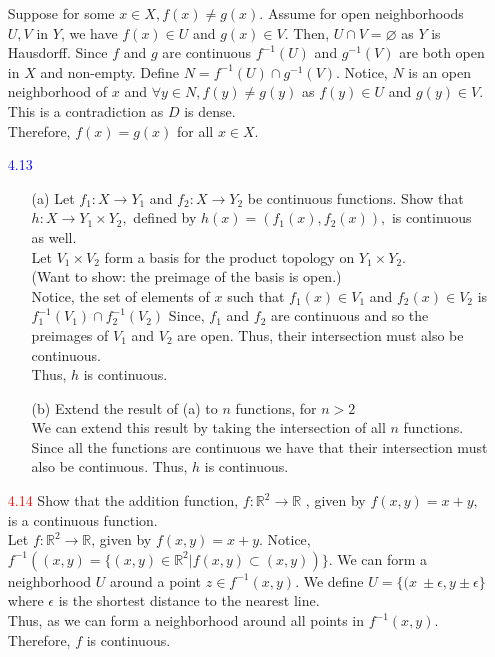 \documentclass[12pt]{article}
\newcommand{\R}{\mathbb{R}}
\begin{document}
\begin{enumerate}
	Suppose for some $ x\in X, f(x)\not= g(x) $. Assume for open neighborhoods $ U,V $ in $ Y $, we have $ f(x)\in U $ and $ g(x) \in V $. Then, $ U\cap V = \varnothing $ as $ Y $ is Hausdorff. Since $ f $ and $ g $ are continuous $ f^{-1}(U) $ and $ g^{-1}(V) $ are both open in $ X $ and non-empty. Define $ N= f^{-1}(U) \cap g^{-1}(V)$. Notice, $ N $ is an open neighborhood of $ x $ and $ \forall y\in N, f(y)\not= g(y) $ as $ f(y)\in U $ and $ g(y)\in V $. This is a contradiction as $ D $ is dense.\\
	Therefore, $ f(x)=g(x) $ for all $ x \in X $.
	
	\item[\textcolor{blue}{4.13}]
	  \begin{enumerate}
	  	\item[(a)] Let $f _ { 1 } : X \rightarrow Y _ { 1 }$ and $f _ { 2 } : X \rightarrow Y _ { 2 }$ be continuous functions. Show that
	  	$h : X \rightarrow Y _ { 1 } \times Y _ { 2 } ,$ defined by $h ( x ) = \left( f _ { 1 } ( x ) , f _ { 2 } ( x ) \right) ,$ is continuous as well.\\
	  	Let $ V_1 \times V_2 $ form a basis for the product topology on $ Y_1\times Y_2 $. \\
	  	(Want to show: the preimage of the basis is open.)\\
	  	Notice, the set of elements of $ x $ such that $ f_1(x)\in V_1 $ and $ f_2(x)\in V_2 $ is $ f^{-1}_1(V_1)\cap f^{-1}_2(V_2) $ Since, $ f_1 $ and $ f_2 $ are continuous and so the preimages of $ V_1 $ and $ V_2 $ are open. Thus, their intersection must also be continuous.\\
	  	Thus, $ h $ is continuous. 
	  	\item[(b)] Extend the result of (a) to $n$ functions, for $n > 2$\\
	  	We can extend this result by taking the intersection of all $ n $ functions. Since all the functions are continuous we have that their intersection must also be continuous. Thus, $ h $ is continuous.
	  \end{enumerate}
	
	\item[\textcolor{red}{4.14}] Show that the addition function, $f : \mathbb { R } ^ { 2 } \rightarrow \mathbb { R }$ , given by $f ( x , y ) = x + y ,$ is a continuous function.\\
	Let $ f : \R^2\rightarrow \R$, given by $ f(x,y)=x+y $. Notice, $ f^{-1}((x,y)=\{(x,y)\in
	 \R^2|f(x,y)\subset (x,y))\}$. We can form a neighborhood $ U $ around a point $ z\in f^{-1}(x,y) $. We define $ U = \{(x\ \pm \epsilon,y\pm\epsilon\}$ where $ \epsilon$ is the shortest distance to the nearest line.\\
	 Thus, as we can form a neighborhood around all points in $ f^{-1}(x,y) $.\\
	 Therefore, $ f $ is continuous.
	

\end{enumerate}
\end{document}
